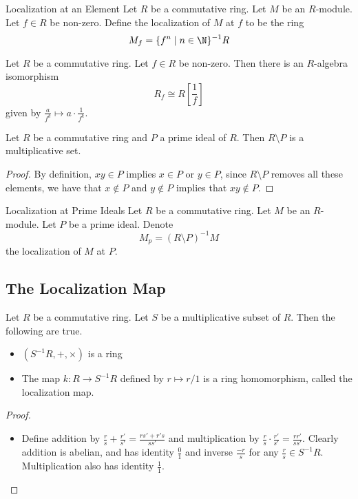 \documentclass[a4paper]{article}
\begin{document}
\begin{defn}{Localization at an Element}{} Let $R$ be a commutative ring. Let $M$ be an $R$-module. Let $f\in R$ be non-zero. Define the localization of $M$ at $f$ to be the ring $$M_f=\{f^n\;|\;n\in\N\}^{-1}R$$
\end{defn}

\begin{lmm}{}{} Let $R$ be a commutative ring. Let $f\in R$ be non-zero. Then there is an $R$-algebra isomorphism $$R_f\cong R\left[\frac{1}{f}\right]$$ given by $\frac{a}{f^k}\mapsto a\cdot\frac{1}{f^k}$. 
\end{lmm}

\begin{lmm}{}{} Let $R$ be a commutative ring and $P$ a prime ideal of $R$. Then $R\setminus P$ is a multiplicative set. \tcbline
\begin{proof}
By definition, $xy\in P$ implies $x\in P$ or $y\in P$, since $R\setminus P$ removes all these elements, we have that $x\notin P$ and $y\notin P$ implies that $xy\notin P$. 
\end{proof}
\end{lmm}

\begin{defn}{Localization at Prime Ideals}{} Let $R$ be a commutative ring. Let $M$ be an $R$-module. Let $P$ be a prime ideal. Denote $$M_p=(R\setminus P)^{-1}M$$ the localization of $M$ at $P$. 
\end{defn}
\subsection{The Localization Map}
\begin{prp}{}{} Let $R$ be a commutative ring. Let $S$ be a multiplicative subset of $R$. Then the following are true. 
\begin{itemize}
\item $(S^{-1}R,+,\times)$ is a ring
\item The map $k:R\to S^{-1}R$ defined by $r\mapsto r/1$ is a ring homomorphism, called the localization map. 
\end{itemize}\tcbline
\begin{proof}~\\
\begin{itemize}
\item Define addition by $\frac{r}{s}+\frac{r'}{s'}=\frac{rs'+r's}{ss'}$ and multiplication by $\frac{r}{s}\cdot\frac{r'}{s'}=\frac{rr'}{ss'}$. Clearly addition is abelian, and has identity $\frac{0}{1}$ and inverse $\frac{-r}{s}$ for any $\frac{r}{s}\in S^{-1}R$. Multiplication also has identity $\frac{1}{1}$. 
\end{itemize}
\end{proof}
\end{prp}
\end{document}
